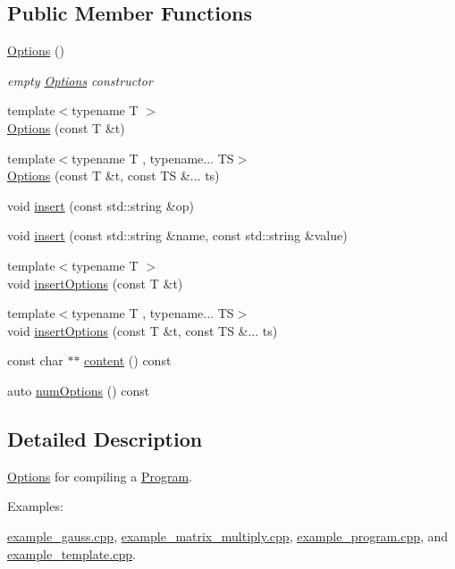 \subsection*{Public Member Functions}
\begin{DoxyCompactItemize}
\item 
\mbox{\label{classyacx_1_1_options_aa5138fe978ac803061ced24c9c8134ee}} 
\hyperlink{classyacx_1_1_options_aa5138fe978ac803061ced24c9c8134ee}{Options} ()
\begin{DoxyCompactList}\small\item\em empty \hyperlink{classyacx_1_1_options}{Options} constructor \end{DoxyCompactList}\item 
{\footnotesize template$<$typename T $>$ }\\\hyperlink{classyacx_1_1_options_a73264e0171ac65cdbfb490cdf2b31b58}{Options} (const T \&t)
\item 
{\footnotesize template$<$typename T , typename... TS$>$ }\\\hyperlink{classyacx_1_1_options_a50cf08d2d6c3923123c493df1f0946a7}{Options} (const T \&t, const TS \&... ts)
\item 
void \hyperlink{classyacx_1_1_options_a717bfff574dc2134fae4a0b3ffc9d656}{insert} (const std\+::string \&op)
\item 
void \hyperlink{classyacx_1_1_options_acd9d1aeff97ef155aee30fd3803b0a2a}{insert} (const std\+::string \&name, const std\+::string \&value)
\item 
{\footnotesize template$<$typename T $>$ }\\void \hyperlink{classyacx_1_1_options_a9a8dba0730ac3c5b3bf48bf0889429de}{insert\+Options} (const T \&t)
\item 
{\footnotesize template$<$typename T , typename... TS$>$ }\\void \hyperlink{classyacx_1_1_options_ae24ed09191356cae7c23d55df7f73897}{insert\+Options} (const T \&t, const TS \&... ts)
\item 
const char $\ast$$\ast$ \hyperlink{classyacx_1_1_options_addb823fd1b5f5af2b7c4073bac8ec70b}{content} () const
\item 
auto \hyperlink{classyacx_1_1_options_af68aa0dd2e790d60e75822d8fb7aa4ee}{num\+Options} () const
\end{DoxyCompactItemize}


\subsection{Detailed Description}
\hyperlink{classyacx_1_1_options}{Options} for compiling a \hyperlink{classyacx_1_1_program}{Program}. \begin{Desc}
\item[Examples\+: ]\par
\hyperlink{example_gauss_8cpp-example}{example\+\_\+gauss.\+cpp}, \hyperlink{example_matrix_multiply_8cpp-example}{example\+\_\+matrix\+\_\+multiply.\+cpp}, \hyperlink{example_program_8cpp-example}{example\+\_\+program.\+cpp}, and \hyperlink{example_template_8cpp-example}{example\+\_\+template.\+cpp}.\end{Desc}


